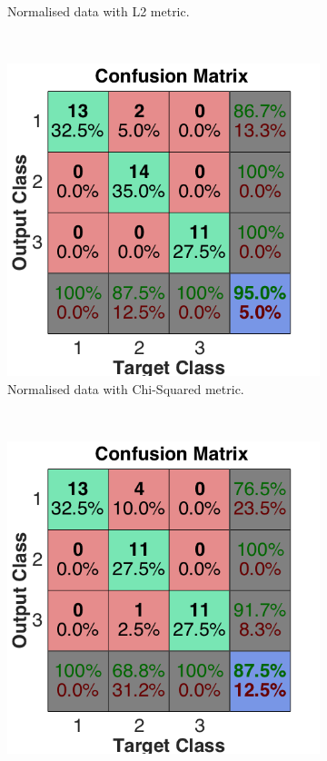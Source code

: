 \documentclass[a4paper, 10pt, conference]{ieeeconf}
\begin{document}
\begin{figure}[!ht]
\begin{subfigure}{0.32\textwidth}
      \caption{Normalised data with L2 metric.}
    \end{subfigure}
    ~
    \begin{subfigure}{0.32\textwidth}
      \includegraphics[width=\textwidth]{pic/mod_chi.png}
      \caption{Normalised data with Chi-Squared metric.}
    \end{subfigure}
    \\
    \begin{subfigure}{0.32\textwidth}
      \includegraphics[width=\textwidth]{pic/mod_inter.png}

\end{subfigure}
\end{figure}
\end{document}
